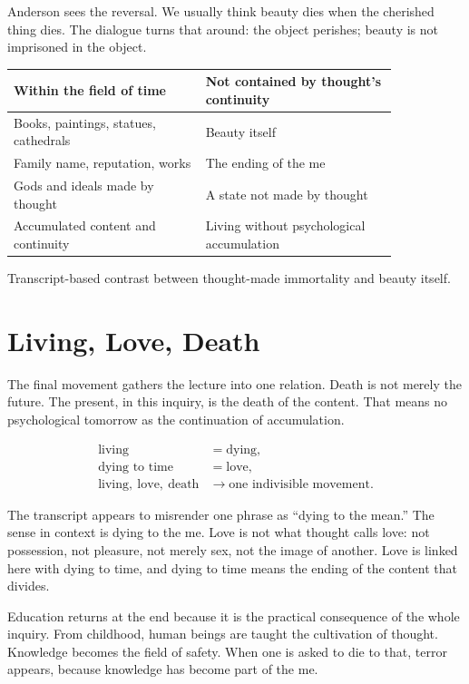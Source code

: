\documentclass[11pt,oneside]{book}
\begin{document}
Anderson sees the reversal. We usually think beauty dies when the cherished thing dies. The dialogue turns that around: the object perishes; beauty is not imprisoned in the object.

\begin{table}
\centering
\begin{tabular}{|p{0.42\linewidth}|p{0.42\linewidth}|}
\hline
\textbf{Within the field of time} & \textbf{Not contained by thought's continuity} \\
\hline
Books, paintings, statues, cathedrals & Beauty itself \\
\hline
Family name, reputation, works & The ending of the me \\
\hline
Gods and ideals made by thought & A state not made by thought \\
\hline
Accumulated content and continuity & Living without psychological accumulation \\
\hline
\end{tabular}

Transcript-based contrast between thought-made immortality and beauty itself.
\end{table}

\section{Living, Love, Death}

The final movement gathers the lecture into one relation. Death is not merely the future. The present, in this inquiry, is the death of the content. That means no psychological tomorrow as the continuation of accumulation.

\begin{align}
\text{living} &= \text{dying},\\
\text{dying to time} &= \text{love},\\
\text{living},\ \text{love},\ \text{death}
&\longrightarrow
\text{one indivisible movement}.
\end{align}

The transcript appears to misrender one phrase as ``dying to the mean.'' The sense in context is dying to the me. Love is not what thought calls love: not possession, not pleasure, not merely sex, not the image of another. Love is linked here with dying to time, and dying to time means the ending of the content that divides.

Education returns at the end because it is the practical consequence of the whole inquiry. From childhood, human beings are taught the cultivation of thought. Knowledge becomes the field of safety. When one is asked to die to that, terror appears, because knowledge has become part of the me.
\end{document}
